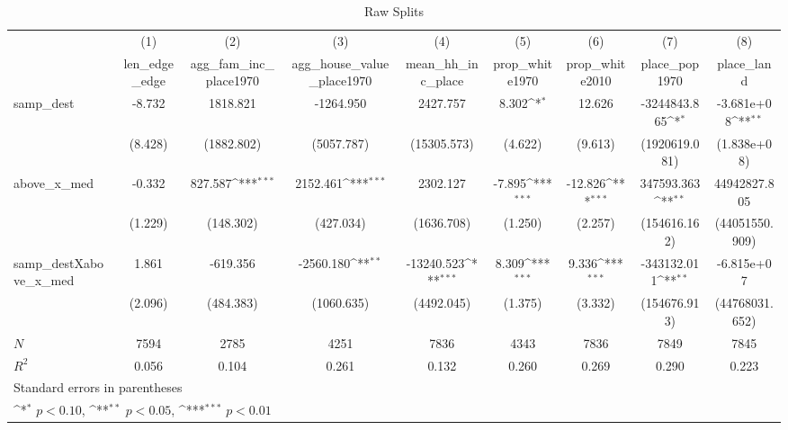 \begin{table}[htbp]\centering
\def\sym#1{\ifmmode^{#1}\else\(^{#1}\)\fi}
\caption{Raw Splits}
\begin{tabular}{l*{8}{c}}
\hline\hline
            &\multicolumn{1}{c}{(1)}&\multicolumn{1}{c}{(2)}&\multicolumn{1}{c}{(3)}&\multicolumn{1}{c}{(4)}&\multicolumn{1}{c}{(5)}&\multicolumn{1}{c}{(6)}&\multicolumn{1}{c}{(7)}&\multicolumn{1}{c}{(8)}\\
            &\multicolumn{1}{c}{len\_edge\_edge}&\multicolumn{1}{c}{agg\_fam\_inc\_place1970}&\multicolumn{1}{c}{agg\_house\_value\_place1970}&\multicolumn{1}{c}{mean\_hh\_inc\_place}&\multicolumn{1}{c}{prop\_white1970}&\multicolumn{1}{c}{prop\_white2010}&\multicolumn{1}{c}{place\_pop1970}&\multicolumn{1}{c}{place\_land}\\
\hline
samp\_dest   &      -8.732         &    1818.821         &   -1264.950         &    2427.757         &       8.302\sym{*}  &      12.626         &-3244843.865\sym{*}  &  -3.681e+08\sym{**} \\
            &     (8.428)         &  (1882.802)         &  (5057.787)         & (15305.573)         &     (4.622)         &     (9.613)         &(1920619.081)         & (1.838e+08)         \\
[1em]
above\_x\_med &      -0.332         &     827.587\sym{***}&    2152.461\sym{***}&    2302.127         &      -7.895\sym{***}&     -12.826\sym{***}&  347593.363\sym{**} &44942827.805         \\
            &     (1.229)         &   (148.302)         &   (427.034)         &  (1636.708)         &     (1.250)         &     (2.257)         &(154616.162)         &(44051550.909)         \\
[1em]
samp\_destXabove\_x\_med&       1.861         &    -619.356         &   -2560.180\sym{**} &  -13240.523\sym{***}&       8.309\sym{***}&       9.336\sym{***}& -343132.011\sym{**} &  -6.815e+07         \\
            &     (2.096)         &   (484.383)         &  (1060.635)         &  (4492.045)         &     (1.375)         &     (3.332)         &(154676.913)         &(44768031.652)         \\
\hline
\(N\)       &        7594         &        2785         &        4251         &        7836         &        4343         &        7836         &        7849         &        7845         \\
\(R^{2}\)   &       0.056         &       0.104         &       0.261         &       0.132         &       0.260         &       0.269         &       0.290         &       0.223         \\
\hline\hline
\multicolumn{9}{l}{\footnotesize Standard errors in parentheses}\\
\multicolumn{9}{l}{\footnotesize \sym{*} \(p<0.10\), \sym{**} \(p<0.05\), \sym{***} \(p<0.01\)}\\
\end{tabular}
\end{table}
